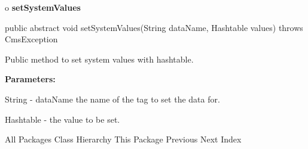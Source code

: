 o {\bf setSystemValues} 

\begin{PRE}
 public abstract void setSystemValues(String dataName,
                                      Hashtable values) throws CmsException
\end{PRE}

\begin{description}
\htmlDD Public method to set system values with hashtable. 

\begin{description}
\item {\bf Parameters:}  

String - dataName the name of the tag to set the data for.  

Hashtable - the value to be set.  
\end{description}

\end{description}

\htmlHR

\begin{PRE}
All Packages  Class Hierarchy  This Package  Previous  Next  Index
\end{PRE}

